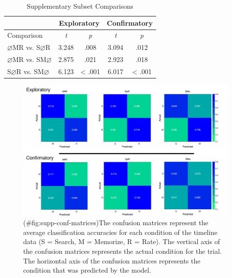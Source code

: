 \begin{appendix}
\begin{table}[!h]
    \centering
    \caption{Supplementary Subset Comparisons}
    \label{tab:supp-comparisons}
    \begin{tabular}{l c c c c}
         & \multicolumn{2}{c}{Exploratory} & \multicolumn{2}{c}{Confirmatory} \\
        \hline
        Comparison & \textit{t} & \multicolumn{1}{c|}{\textit{p}} & \textit{t} & \textit{p} \\
        \hline
        $\varnothing$MR vs. S$\varnothing$R & 3.248 & \multicolumn{1}{c|}{.008} & 3.094 & .012 \\
        $\varnothing$MR vs. SM$\varnothing$ & 2.875 & \multicolumn{1}{c|}{.021} & 2.923 & .018 \\
        S$\varnothing$R vs. SM$\varnothing$ & 6.123 & \multicolumn{1}{c|}{< .001} & 6.017 & < .001 \\
        \hline
    \end{tabular}
\end{table}

\begin{figure}
\centering
\includegraphics{figures/supp_analysis/confusion_matrices/supp_conf_matrices.pdf}
\caption{(\#fig:supp-conf-matrices)The confusion matrices represent the
average classification accuracies for each condition of the timeline
data (S = Search, M = Memorize, R = Rate). The vertical axis of the
confusion matrices represents the actual condition for the trial. The
horizontal axis of the confusion matrices represents the condition that
was predicted by the model.}
\end{figure}


\end{appendix}
